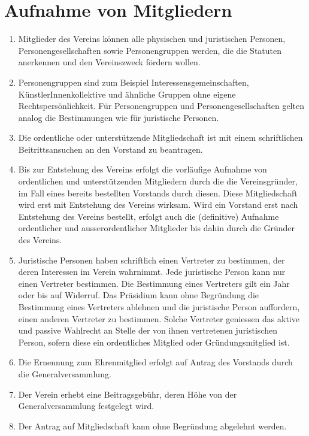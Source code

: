 \documentclass[a4paper,12pt]{article}
\begin{document}
	\section{Aufnahme von Mitgliedern}
		\label{sec:aufname-mitglieder}
		\begin{enumerate}
			\item Mitglieder des Vereins können alle physischen und juristischen Personen, Personengesellschaften sowie Personengruppen werden, die die Statuten anerkennen und den Vereinszweck fördern wollen.
			\item Personengruppen sind zum Beispiel Interessensgemeinschaften, KünstlerInnenkollektive und ähnliche Gruppen ohne eigene Rechtspersönlichkeit. Für Personengruppen und Personengesellschaften gelten analog die Bestimmungen wie für juristische Personen.
			\item Die ordentliche oder unterstützende Mitgliedschaft ist mit einem schriftlichen Beitrittsansuchen an den Vorstand zu beantragen.
			\item Bis zur Entstehung des Vereins erfolgt die vorläufige Aufnahme von ordentlichen und unterstützenden Mitgliedern durch die die Vereinsgründer, im Fall eines bereits bestellten Vorstands durch diesen. Diese Mitgliedschaft wird erst mit Entstehung des Vereins wirksam. Wird ein Vorstand erst nach Entstehung des Vereins bestellt, erfolgt auch die (definitive) Aufnahme ordentlicher und ausserordentlicher Mitglieder bis dahin durch die Gründer des Vereins.
			\item Juristische Personen haben schriftlich einen Vertreter zu bestimmen, der deren Interessen im Verein wahrnimmt. Jede juristische Person kann nur einen Vertreter bestimmen. Die Bestimmung eines Vertreters gilt ein Jahr oder bis auf Widerruf. Das Präsidium kann ohne Begründung die Bestimmung eines Vertreters ablehnen und die juristische Person auffordern, einen anderen Vertreter zu bestimmen. Solche Vertreter geniessen das aktive und passive Wahlrecht an Stelle der von ihnen vertretenen juristischen Person, sofern diese ein ordentliches Mitglied oder Gründungsmitglied ist.
			\item Die Ernennung zum Ehrenmitglied erfolgt auf Antrag des Vorstands durch die Generalversammlung.
			\item Der Verein erhebt eine Beitragsgebühr, deren Höhe von der Generalversammlung festgelegt wird.
			\item Der Antrag auf Mitgliedschaft kann ohne Begründung abgelehnt werden.
		\end{enumerate}
\end{document}
